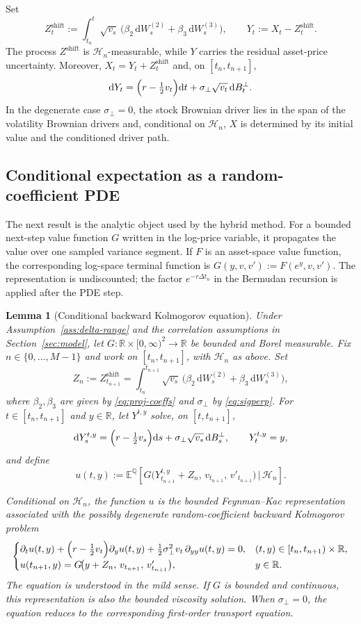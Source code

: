 \documentclass[pdflatex,sn-mathphys-num]{sn-jnl}
\theoremstyle{thmstyleone}%
\newtheorem{lemma}[theorem]{Lemma}
\theoremstyle{thmstylethree}%
\theoremstyle{thmstyletwo}%
\newcommand{\dd}{\mathrm d}
\newcommand{\E}{\mathbb E}
\newcommand{\Q}{\mathbb Q}
\newcommand{\R}{\mathbb R}
\begin{document}
Set
\[
Z^{\mathrm{shift}}_t:=\int_{t_n}^t \sqrt{v_s}\,\bigl(\beta_2\,\dd W^{(2)}_s+\beta_3\,\dd W^{(3)}_s\bigr),
\qquad
Y_t:=X_t-Z^{\mathrm{shift}}_t.
\]
The process $Z^{\mathrm{shift}}$ is $\mathcal H_n$-measurable, while $Y$ carries the residual asset-price
uncertainty. Moreover, $X_t=Y_t+Z^{\mathrm{shift}}_t$ and, on $[t_n,t_{n+1}]$,
\[
\dd Y_t=\Bigl(r-\tfrac12 v_t\Bigr)\dd t+\sigma_\perp\sqrt{v_t}\,\dd B^\perp_t.
\]
In the degenerate case $\sigma_\perp=0$, the stock Brownian driver lies in the span of the
volatility Brownian drivers and, conditional on $\mathcal H_n$, $X$ is determined by its initial value and the
conditioned driver path.

\subsection{Conditional expectation as a random-coefficient PDE}

The next result is the analytic object used by the hybrid method. For a bounded next-step value function $G$
written in the log-price variable, it propagates the value over one sampled variance segment. If $F$ is an
asset-space value function, the corresponding log-space terminal function is $G(y,v,v'):=F(e^y,v,v')$. The
representation is undiscounted; the factor $e^{-r\Delta t_n}$ in the Bermudan recursion is applied after the PDE
step.

\begin{lemma}[Conditional backward Kolmogorov equation]\label{lem:cond-PDE}
Under Assumption~\ref{ass:delta-range} and the correlation assumptions in Section~\ref{sec:model}, let $G:\R\times[0,\infty)^2\to\R$ be bounded and Borel measurable.
Fix $n\in\{0,\dots,M-1\}$ and work on $[t_n,t_{n+1}]$, with $\mathcal H_n$ as above. Set
\[
Z_n := Z^{\mathrm{shift}}_{t_{n+1}}
= \int_{t_n}^{t_{n+1}} \sqrt{v_s}\,\bigl(\beta_2\,\dd W^{(2)}_s+\beta_3\,\dd W^{(3)}_s\bigr),
\]
where $\beta_2,\beta_3$ are given by \eqref{eq:proj-coeffs} and $\sigma_\perp$ by \eqref{eq:sigperp}.
For $t\in[t_n,t_{n+1}]$ and $y\in\R$, let $Y^{t,y}$ solve, on $[t,t_{n+1}]$,
\[
\dd Y^{t,y}_s
=\Bigl(r-\tfrac12 v_s\Bigr)\dd s+\sigma_\perp\sqrt{v_s}\,\dd B^\perp_s,
\qquad
Y^{t,y}_t=y,
\]
and define
\[
u(t,y)
:=
\E^\Q\!\left[
G\!\bigl(Y^{t,y}_{t_{n+1}}+Z_n,\,v_{t_{n+1}},\,v'_{t_{n+1}}\bigr)\,\Big|\,\mathcal H_n
\right].
\]

Conditional on $\mathcal H_n$, the function $u$ is the bounded Feynman--Kac representation associated with
the possibly degenerate random-coefficient backward Kolmogorov problem
\[
\begin{cases}
\partial_t u(t,y)+\Bigl(r-\tfrac12 v_t\Bigr)\partial_y u(t,y)
+\tfrac12\sigma_\perp^2 v_t\,\partial_{yy}u(t,y)=0,
& (t,y)\in[t_n,t_{n+1})\times\R,\\[2pt]
u(t_{n+1},y)=G\!\bigl(y+Z_n,\,v_{t_{n+1}},\,v'_{t_{n+1}}\bigr),
& y\in\R.
\end{cases}
\]
The equation is understood in the mild sense. If $G$ is bounded and continuous, this representation is also
the bounded viscosity solution. When $\sigma_\perp=0$, the equation reduces to the corresponding first-order
transport equation.
\end{lemma}
\end{document}
